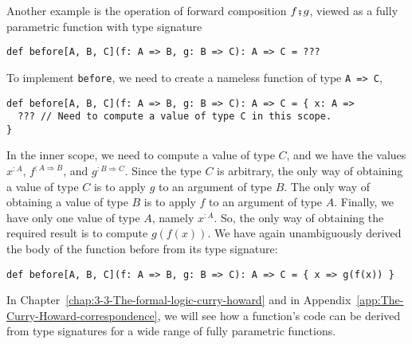 Another example is the operation of forward composition $f\bef g$,
viewed as a fully parametric function with type signature
\begin{lstlisting}
def before[A, B, C](f: A => B, g: B => C): A => C = ???
\end{lstlisting}
To implement \lstinline!before!,
we need to create a nameless function of type \lstinline!A => C!,
\begin{lstlisting}
def before[A, B, C](f: A => B, g: B => C): A => C = { x: A =>
  ??? // Need to compute a value of type C in this scope.
}
\end{lstlisting}
In the inner scope, we need to compute a value of type $C$, and we
have the values $x^{:A}$, $f^{:A\Rightarrow B}$, and $g^{:B\Rightarrow C}$.
Since the type $C$ is arbitrary, the only way of obtaining a value
of type $C$ is to apply $g$ to an argument of type $B$. The only
way of obtaining a value of type $B$ is to apply $f$ to an argument
of type $A$. Finally, we have only one value of type $A$, namely
$x^{:A}$. So, the only way of obtaining the required result is to
compute $g(f(x))$. We have again unambiguously derived the body of
the function before from its type signature:
\begin{lstlisting}
def before[A, B, C](f: A => B, g: B => C): A => C = { x => g(f(x)) }
\end{lstlisting}
In Chapter~\ref{chap:3-3-The-formal-logic-curry-howard} and in Appendix~\ref{app:The-Curry-Howard-correspondence},
we will see how a function's code can be derived from type signatures
for a wide range of fully parametric functions.
